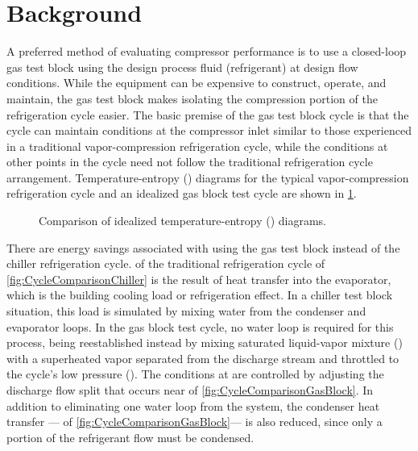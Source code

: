 \section{Background} \label{sec:background}
A preferred method of evaluating compressor performance is to use a closed-loop gas test block
using the design process fluid (refrigerant) at design flow conditions. 
While the equipment can be expensive to construct, operate, and maintain, 
the gas test block makes isolating the compression portion of the refrigeration cycle easier. 
The basic premise of the gas test block cycle is that 
the cycle can maintain conditions at the compressor inlet similar to those experienced in a traditional vapor-compression refrigeration cycle, 
while the conditions at other points in the cycle need not follow the traditional refrigeration cycle arrangement. 
Temperature-entropy (\tssymb)%
%
diagrams for the typical vapor-compression refrigeration cycle 
and an idealized gas block test cycle are shown in \cref{fig:CycleComparison}. 
\begin{figure}[htbp]
  \centering
  \hfill
  \caption{Comparison of idealized temperature-entropy (\tssymb) diagrams.}
  \label{fig:CycleComparison}
\end{figure}

There are energy savings associated with using the gas test block 
instead of the chiller refrigeration cycle. 
 of the traditional refrigeration cycle of \cref{fig:CycleComparisonChiller} 
is the result of heat transfer into the evaporator, 
which is the building cooling load or refrigeration effect. 
In a chiller test block situation, this load is simulated 
by mixing water from the condenser and evaporator loops. 
In the gas block test cycle, no water loop is required for this process, 
 being reestablished instead by mixing saturated liquid-vapor mixture () 
with a superheated vapor separated from the discharge stream and throttled to the cycle's low pressure (). 
The conditions at  are controlled by adjusting 
the discharge flow split that occurs near  of \cref{fig:CycleComparisonGasBlock}. 
In addition to eliminating one water loop from the system, the condenser heat transfer%
--- of \cref{fig:CycleComparisonGasBlock}---%
is also reduced, since only a portion of the refrigerant flow must be condensed.

